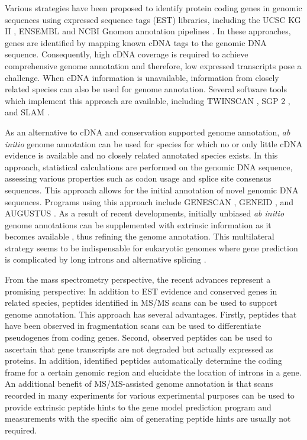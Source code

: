 Various strategies have been proposed to identify protein coding genes in
genomic sequences using expressed sequence tags (EST) libraries, 
including the UCSC KG II \citep{Karolchik2003}, ENSEMBL \citep{Hubbard2005} 
and NCBI Gnomon annotation pipelines \citep{Maglott2005}.
In these approaches, genes are identified by mapping known cDNA tags to the
genomic DNA sequence.
Consequently, high cDNA coverage is required to achieve comprehensive
genome annotation and therefore, low expressed transcripts pose a challenge.
When cDNA information is unavailable, information from closely related
species can also be used for genome annotation.
Several software tools which implement this approach are available,
including TWINSCAN \citep{Korf2001}, SGP 2 \citep{Parra2003}, and 
SLAM \citep{Cawley2003}.

As an alternative to cDNA and conservation supported genome annotation,
{\em ab initio} genome annotation can be used for species for which no
or only little cDNA evidence is available and no closely related annotated
species exists.
In this approach, statistical calculations are performed on the genomic
DNA sequence, assessing various properties such as codon usage and splice 
site consensus sequences.
This approach allows for the initial annotation of novel genomic DNA 
sequences.
Programs using this approach include GENESCAN \citep{Burge1997}, 
GENEID \citep{Parra2000}, and AUGUSTUS \citep{Stanke2004, Stanke2006}.
As a result of recent developments, initially unbiased {\em ab initio} 
genome annotations can be supplemented with extrinsic information as it 
becomes available \citep{Stanke2008}, thus refining the genome annotation.
This multilateral strategy seems to be indispensable for eukaryotic genomes
where gene prediction is complicated by long introns and alternative splicing
\citep{Brent2004}.

From the mass spectrometry perspective, the recent advances represent a
promising perspective: In addition to EST evidence and conserved genes in
related species, peptides identified in MS/MS scans can be used to support
genome annotation.
This approach has several advantages. Firstly, peptides that have been observed
in fragmentation scans can be used to differentiate pseudogenes from coding 
genes. 
Second, observed peptides can be used to ascertain that gene transcripts
are not degraded but actually expressed as proteins.
In addition, identified peptides automatically determine the coding frame
for a certain genomic region and elucidate the location of introns in a gene.
An additional benefit of MS/MS-assisted genome annotation is that scans recorded
in many experiments for various experimental purposes can be used to provide
extrinsic peptide hints to the gene model prediction program and measurements 
with the specific aim of generating peptide hints are usually not required.


